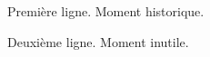 \documentclass[a4paper,12pt]{report}
\begin{document}


Première ligne. Moment historique.

Deuxième ligne. Moment inutile.



\end{document}
